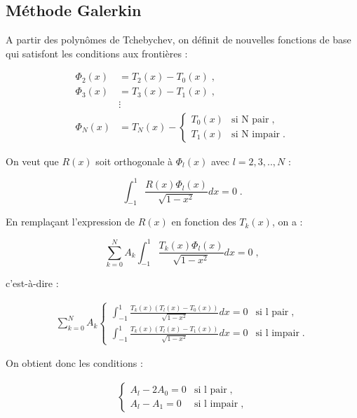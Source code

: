 \documentclass{report}
\begin{document}
\subsection{Méthode Galerkin}

A partir des polynômes de Tchebychev, on définit de nouvelles fonctions de base qui satisfont les conditions aux frontières :

\begin{align}
\Phi_{2}(x) &= T_2(x)-T_0(x)\;,\\
\Phi_{3}(x) &= T_3(x)-T_1(x)\;,\\
 & \vdots\\
\Phi_{N}(x) &= T_N(x)- \begin{cases}
    T_0(x) & \text{si N pair}\;, \\
T_1(x) & \text{si N impair}\;.
  \end{cases}
\end{align}

On veut que $R(x)$ soit orthogonale à $\Phi_l(x)$ avec $l=2,3,..,N$ :

\begin{equation}
\int_{-1}^1 \frac{R(x) \Phi_l(x)}{\sqrt{1-x^2}} dx = 0\;.
\end{equation}

En remplaçant l'expression de $R(x)$ en fonction des $T_k(x)$, on a :

\begin{equation}
\sum_{k=0}^{N}A_{k} \int_{-1}^1 \frac{T_k(x) \Phi_l(x)}{\sqrt{1-x^2}} dx = 0\;,
\end{equation}

c'est-à-dire :

\begin{align}
\sum_{k=0}^{N}A_{k} \begin{cases}
    \int_{-1}^1 \frac{T_k(x) \left(T_l(x)-T_0(x)\right)}{\sqrt{1-x^2}} dx = 0 & \text{si l pair}\;, \\
\int_{-1}^1 \frac{T_k(x) \left(T_l(x)-T_1(x)\right)}{\sqrt{1-x^2}} dx = 0 & \text{si l impair}\;.
  \end{cases}
\end{align}

On obtient donc les conditions :

\begin{align}
\begin{cases}
A_{l} - 2A_{0} = 0 & \text{si l pair}\;, \\
A_{l} - A_{1} = 0 & \text{si l impair}\;,
  \end{cases}
\end{align}
\end{document}
